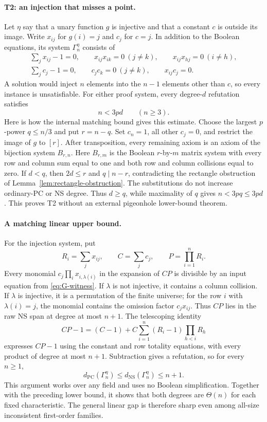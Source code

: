 \documentclass[11pt,a4paper]{article}
\theoremstyle{definition}\newtheorem{definition}[theorem]{Definition}
\theoremstyle{remark}\newtheorem{remark}[theorem]{Remark}
\newcommand{\NS}{\mathrm{NS}}\newcommand{\PC}{\mathrm{PC}}
\begin{document}
\paragraph{T2: an injection that misses a point.}
Let $\eta$ say that a unary function $g$ is injective and that a constant
$c$ is outside its image. Write $x_{ij}$ for $g(i)=j$ and $c_j$ for $c=j$.
In addition to the Boolean equations, its system $\Gamma_n^\eta$ consists of
\begin{equation}\label{eq:G-witness}
\begin{gathered}
 \sum_jx_{ij}-1=0,\qquad
 x_{ij}x_{ik}=0\ (j\ne k),\qquad
 x_{ij}x_{hj}=0\ (i\ne h),\\
 \sum_jc_j-1=0,\qquad
 c_jc_k=0\ (j\ne k),\qquad x_{ij}c_j=0.
\end{gathered}
\end{equation}
A solution would inject $n$ elements into the $n-1$ elements other than $c$,
so every instance is unsatisfiable. For either proof system, every
degree-$d$ refutation satisfies
\[
 n<3pd\qquad(n\geq3).
\]
Here is how the internal matching bound gives this estimate. Choose the
largest $p$-power $q\leq n/3$ and put $r=n-q$. Set $c_n=1$, all other
$c_j=0$, and restrict the image of $g$ to $[r]$. After transposition, every
remaining axiom is an axiom of the bijection system $B_{r,n}$.
Here $B_{r,m}$ is the Boolean $r$-by-$m$ matrix system with every row and
column sum equal to one and both row and column collisions equal to zero.
If $d<q$, then $2d\leq r$ and $q\mid n-r$, contradicting the rectangle
obstruction of Lemma~\ref{lem:rectangle-obstruction}. The substitutions do
not increase ordinary-PC or NS degree. Thus $d\geq q$, while maximality of
$q$ gives $n<3pq\leq3pd$. This proves T2 without an external pigeonhole
lower-bound theorem.

\paragraph{A matching linear upper bound.}
For the injection system, put
\[
 R_i=\sum_jx_{ij},\qquad C=\sum_jc_j,\qquad P=\prod_{i=1}^nR_i.
\]
Every monomial $c_j\prod_i x_{i,\lambda(i)}$ in the expansion of $CP$
is divisible by an input equation from \eqref{eq:G-witness}. If
$\lambda$ is not injective, it contains a column collision. If
$\lambda$ is injective, it is a permutation of the finite universe;
for the row $i$ with $\lambda(i)=j$, the monomial contains the omission
factor $c_jx_{ij}$. Thus $CP$ lies in the raw NS span at degree at most
$n+1$. The telescoping identity
\[
 CP-1=(C-1)+C\sum_{i=1}^n(R_i-1)\prod_{h<i}R_h
\]
expresses $CP-1$ using the constant and row totality equations, with
every product of degree at most $n+1$. Subtraction gives a refutation,
so for every $n\ge1$,
\[
 d_{\PC}(\Gamma_n^\eta)\le d_{\NS}(\Gamma_n^\eta)\le n+1.
\]
This argument works over any field and uses no Boolean simplification.
Together with the preceding lower bound, it shows that both degrees are
$\Theta(n)$ for each fixed characteristic. The general linear gap is
therefore sharp even among all-size inconsistent first-order families.
\end{document}

